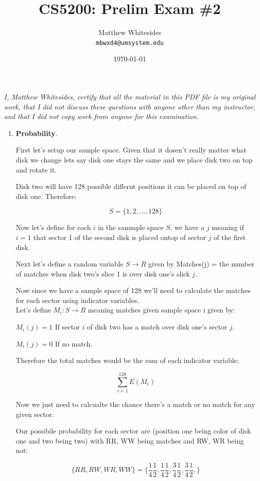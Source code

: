 \documentclass{article}
\title{CS5200: Prelim Exam \#2} %
\author{Matthew Whitesides\\ \texttt{mbwxd4@umsystem.edu}} %
\date{\today} %
\begin{document}
  \maketitle %

  \textit{I, Matthew Whitesides, certify that all the material in this PDF file is my original work, that I did not discuss these questions with anyone other than my instructor, and that I did not copy work from anyone for this examination.}
 
  \begin{enumerate}
    \item \textbf{Probability}.
    
    First let's setup our sample space. Given that it dosen't really matter what disk we change lets say disk one stays the same and we place disk two on top and rotate it.

    Disk two will have 128 possible differnt positions it can be placed on top of disk one. Therefore:
    
    \[S=\{1,2,...,128\}\]

    Now let's define for each $i$ in the sammple space $S$, we have a $j$ meaning if $i = 1$ that sector 1 of the second disk is placed ontop of sector $j$ of the first disk.

    Next let's define a random variable $S\rightarrow R$ given by Matches(j) = the number of matches when disk two's slice 1 is over disk one's slick $j$.

    Now since we have a sample space of 128 we'll need to calculate the matches for each sector using indicator variables.\\

    Let's define $M_i:S\rightarrow R$ meaning matches given sample space i given by:

    $M_i(j) = 1$ If sector $i$ of disk two has a match over disk one's sector $j$.

    $M_i(j) = 0$ If no match.

    Therefore the total matches would be the sum of each indicator variable:

    \[\sum_{i=1}^{128}E(M_i)\]

    Now we just need to calcualte the chance there's a match or no match for any given sector.

    Our possibile probability for each sector are (position one being color of disk one and two being two) with RR, WW being matches and RW, WR being not:

    \[\{RR, RW, WR, WW\} = \{\frac{1}{4} \frac{1}{2}, \frac{1}{4} \frac{1}{2}, \frac{3}{4} \frac{1}{2}, \frac{3}{4} \frac{1}{2}, \}\]


\end{enumerate}
\end{document}
